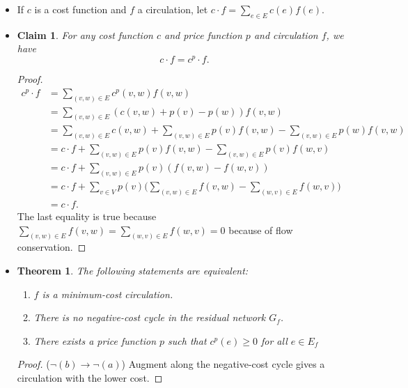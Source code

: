 \documentclass[10pt]{article}
\newtheorem{theorem}[lemma]{Theorem}
\newtheorem{claim}[lemma]{Claim}
\begin{document}
\begin{itemize}
    \item If $c$ is a cost function and $f$ a circulation, let $c \cdot f = \sum_{e \in E} c(e) f(e).$
    
    \item
      \begin{claim} \label{cycle-invariant}
        For any cost function $c$ and price function $p$ and circulation $f$, we have
        $$c \cdot f = c^p \cdot f.$$
      \end{claim}
      \begin{proof}
        \begin{align*}
          c^p \cdot f 
          &= \sum_{(v,w) \in E} c^p(v,w) f(v,w) \\
          &= \sum_{(v,w) \in E} (c(v,w) + p(v) - p(w))f(v,w) \\
          &= \sum_{(v,w) \in E} c(v,w) + \sum_{(v,w) \in E} p(v) f(v,w) - \sum_{(v,w) \in E} p(w) f(v,w)\\
          &= c \cdot f + \sum_{(v,w) \in E} p(v) f(v,w) - \sum_{(v,w) \in E} p(v) f(w,v) \\
          &= c \cdot f + \sum_{(v,w) \in E} p(v) (f(v,w) - f(w,v))\\
          &= c \cdot f + \sum_{v \in V} p(v) \Big( \sum_{(v,w) \in E} f(v,w) - \sum_{(w,v) \in E} f(w,v) \Big)\\
          &= c \cdot f.
        \end{align*}
        The last equality is true because $\sum_{(v,w) \in E} f(v,w) = \sum_{(w,v) \in E} f(w,v) = 0$
        because of flow conservation.
      \end{proof}
    
    \item
      \begin{theorem} \label{optimality}
        The following statements are equivalent:
        \renewcommand{\labelenumi}{(\alph{enumi})}
        \begin{enumerate}
          \item $f$ is a minimum-cost circulation.
          \item There is no negative-cost cycle in the residual network $G_f$.
          \item There exists a price function $p$ such that $c^p(e) \geq 0$ for all $e \in E_f$
        \end{enumerate}
      \end{theorem}
      \begin{proof}
        ($\neg(b) \rightarrow \neg(a)$) Augment along the negative-cost cycle gives
          a circulation with the lower cost. \medskip
        

\end{proof}
\end{itemize}
\end{document}
